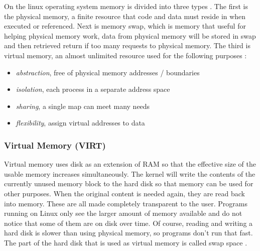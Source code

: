 On the linux operating system memory is divided into three types \cite{manual:linux}. The first is the physical memory, a finite resource that code and data must reside in when executed or referenced. Next is memory swap, which is memory that useful for helping physical memory work, data from physical memory will be stored in swap and then retrieved return if too many requests to physical memory. The third is virtual memory, an almost unlimited resource used for the following purposes \cite{book:os}:

\begin{itemize} [noitemsep, topsep=0pt]
    \item \textit{abstraction}, free of physical memory addresses / boundaries
    \item \textit{isolation}, each process in a separate address space 
    \item \textit{sharing}, a single map can meet many needs 
    \item \textit{flexibility}, assign virtual addresses to data
\end{itemize}

\subsubsection{Virtual Memory (VIRT)}

Virtual memory uses disk as an extension of RAM so that the effective size of the usable memory increases simultaneously. The kernel will write the contents of the currently unused memory block to the hard disk so that memory can be used for other purposes. When the original content is needed again, they are read back into memory. These are all made completely transparent to the user. Programs running on Linux only see the larger amount of memory available and do not notice that some of them are on disk over time. Of course, reading and writing a hard disk is slower than using physical memory, so programs don't run that fast. The part of the hard disk that is used as virtual memory is called swap space \cite{site:ltdp}.

